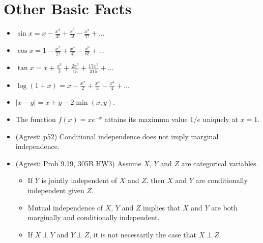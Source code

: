 \documentclass[twoside]{article}
\newcommand{\dis}{\displaystyle}
\begin{document}
\section{Other Basic Facts}
\begin{itemize}
\item $\sin x = x - \dis\frac{x^3}{3!} + \dis\frac{x^5}{5!} - \dis\frac{x^7}{7!} + \dots$

\item $\cos x = 1 - \dis\frac{x^2}{2!} + \dis\frac{x^4}{4!} - \dis\frac{x^6}{6!} + \dots$

\item $\tan x = x + \dis\frac{x^3}{3} + \dis\frac{2x^5}{15} + \dis\frac{17x^7}{315} + \dots$

\item $\log (1 + x) = x - \dis\frac{x^2}{2} + \dis\frac{x^3}{3} - \dis\frac{x^4}{4} + \dots$

\item $|x-y| =  x + y - 2 \min(x,y)$.

\item The function $f(x) = xe^{-x}$ attains its maximum value $1/e$ uniquely at $x = 1$.

\item (Agresti p52) Conditional independence does not imply marginal independence.

\item (Agresti Prob 9.19, 305B HW3) Assume $X$, $Y$ and $Z$ are categorical variables.
\begin{itemize}
\item If $Y$ is jointly independent of $X$ and $Z$, then $X$ and $Y$ are conditionally independent given $Z$.

\item Mutual independence of $X$, $Y$ and $Z$ implies that $X$ and $Y$ are both marginally and conditionally independent.

\item If $X \perp Y$ and $Y \perp Z$, it is not necessarily the case that $X \perp Z$.
\end{itemize}

\end{itemize}
\end{document}
